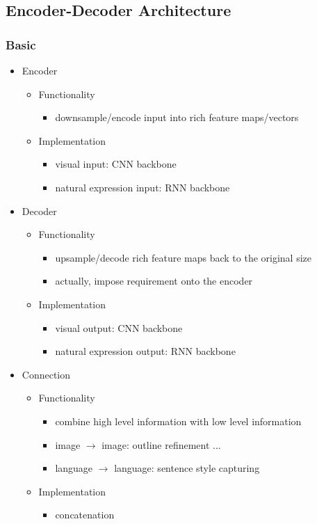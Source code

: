 \subsection{Encoder-Decoder Architecture}
\subsubsection{Basic}
\begin{itemize}
\item Encoder
	\begin{itemize}
	\item Functionality
		\begin{itemize}
		\item downsample/encode input into rich feature maps/vectors
		\end{itemize}
	\item Implementation
		\begin{itemize}
		\item visual input: CNN backbone
		\item natural expression input: RNN backbone
		\end{itemize}
	\end{itemize}
\item Decoder
	\begin{itemize}
	\item Functionality
		\begin{itemize}
		\item upsample/decode rich feature maps back to the original size
		\item actually, impose requirement onto the encoder
		\end{itemize}
	\item Implementation
		\begin{itemize}
		\item visual output: CNN backbone
		\item natural expression output: RNN backbone
		\end{itemize}
	\end{itemize}
\item Connection
	\begin{itemize}
	\item Functionality
		\begin{itemize}
		\item combine high level information with low level information
		\item image $\rightarrow$ image: outline refinement ...
		\item language $\rightarrow$ language: sentence style capturing
		\end{itemize}
	\item Implementation
		\begin{itemize}
		\item concatenation
		\end{itemize}
	\end{itemize}
\end{itemize}

